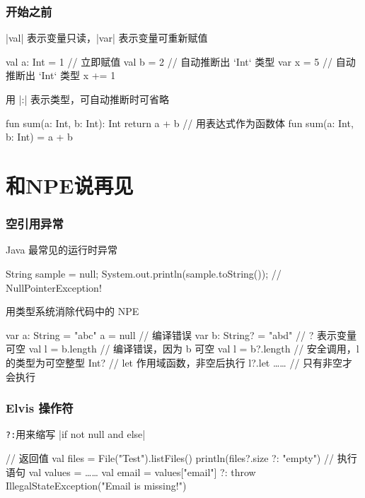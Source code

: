 \begin{frame}[fragile]
\frametitle{开始之前}
\begin{quotebox}
    |val| 表示变量只读，|var| 表示变量可重新赋值
\end{quotebox}
\begin{kotlincode}[basicstyle=\scriptsize\ttfamily]
    val a: Int = 1  // 立即赋值
    val b = 2   // 自动推断出 `Int` 类型
    var x = 5 // 自动推断出 `Int` 类型
    x += 1
\end{kotlincode}
\begin{quotebox}
    用 |:| 表示类型，可自动推断时可省略
\end{quotebox}
\begin{kotlincode}[basicstyle=\scriptsize\ttfamily]
    fun sum(a: Int, b: Int): Int {
        return a + b
    }
    // 用表达式作为函数体
    fun sum(a: Int, b: Int) = a + b
\end{kotlincode}
\end{frame}
\section{和NPE说再见}
\begin{frame}[fragile]
    \frametitle{空引用异常}
    \begin{quotebox}[penrosered]
        Java 最常见的运行时异常
    \end{quotebox}
    \begin{javacode}[basicstyle=\scriptsize\ttfamily,emph={[1]sample}]
    String sample = null;
    System.out.println(sample.toString()); // NullPointerException!
    \end{javacode}
    \begin{quotebox}
        \kotlin{} 用类型系统消除代码中的 NPE
    \end{quotebox}
    \begin{kotlincode}[basicstyle=\scriptsize\ttfamily]
    var a: String = "abc"
    a = null // 编译错误
    var b: String? = "abd" // ? 表示变量可空
    val l = b.length // 编译错误，因为 b 可空
    val l = b?.length // 安全调用，l 的类型为可空整型 Int?
    // let 作用域函数，非空后执行
    l?.let { …… // 只有非空才会执行 }
    \end{kotlincode}
\end{frame}

\begin{frame}[fragile]
    \frametitle{Elvis 操作符}
    \begin{quotebox}
        \textcolor{penroseblue}{\texttt{?:}}用来缩写 |if not null and else|
    \end{quotebox}
    \begin{kotlincode}[basicstyle=\scriptsize\ttfamily]
    // 返回值
    val files = File("Test").listFiles()
    println(files?.size ?: "empty")
    // 执行语句
    val values = ……
    val email = values["email"] ?: throw IllegalStateException("Email is missing!")
    \end{kotlincode}
\end{frame}

